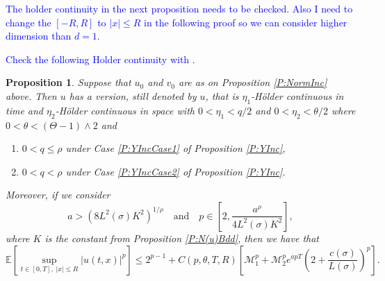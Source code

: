 \documentclass[a4paper,11pt]{article}
\numberwithin{equation}{section}
\theoremstyle{plain}
\newtheorem{proposition}[theorem]{Proposition}
\theoremstyle{definition}
\numberwithin{NQ}{section}
\numberwithin{LQ}{section}
\numberwithin{ZQ}{section}
\begin{document}
	\textcolor{blue}{The holder continuity in the next proposition needs to be checked. Also I need to change the $[-R,R]$ to $|x| \le R$ in the following proof so we can consider higher dimension than $d=1$.}
	
	\textcolor{blue}{Check the following Holder continuity with \cite{ChenHu21}.}
	
	\begin{proposition}
		\label{P:Holder}
		Suppose that $u_0$ and $v_0$ are as on Proposition \ref{P:NormInc} above. Then $u$ has a version, still denoted by $u$, that is $\eta_1$-H\"older continuous in time and $\eta_2$-H\"older continuous in space with $0<\eta_1 < q/2$ and $0<\eta_2 < \theta/2$ where $0< \theta < (\Theta -1) \wedge 2$ and
		\begin{enumerate}
			\item $0< q \le \rho$ under Case \ref{P:YIncCase1} of Proposition \ref{P:YInc},
			\item $0 < q < \rho$ under Case \ref{P:YIncCase2} of Proposition \ref{P:YInc}.
		\end{enumerate}
		Moreover, if we consider
		\[
		a > \left( 8 L^2(\sigma)K^2\right)^{1/\rho} \quad \text{and} \quad 	p \in \left[ 2, \frac{a^{\rho}}{4L^2(\sigma)K^2} \right],
		\]
		where $K$ is the constant from Proposition \ref{P:N(u)Bdd}, then we have that 
		\[
		\mathbb{E}\left[ \sup_{t\in[0,T],\; |x| \le R} |u(t,x)|^p \right] \le 2^{p-1} + C(p, \theta, T,R) \left[ \mathcal{M}_1^p + \mathcal{M}_2^p e^{apT} \left(2 +  \frac{c(\sigma)}{L(\sigma)}\right)^p\right].
		\]
	\end{proposition}
	
\end{document}
